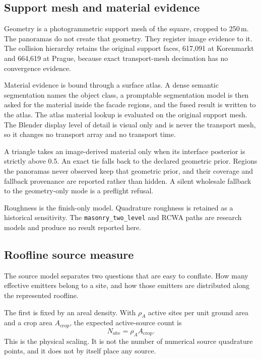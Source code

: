 \subsection{Support mesh and material evidence}
\label{sec:atlas}

Geometry is a photogrammetric support mesh of the square, cropped to 250\,m.
The panoramas do not create that geometry. They register image evidence to it.
The collision hierarchy retains the original support faces, 617,091 at
Korenmarkt and 664,619 at Prague, because exact transport-mesh decimation has
no convergence evidence.

Material evidence is bound through a surface atlas. A dense semantic
segmentation names the object class, a promptable segmentation model is then
asked for the material inside the facade regions, and the fused result is
written to the atlas. The atlas material lookup is evaluated on the original
support mesh. The Blender display level of detail is visual only and is never
the transport mesh, so it changes no transport array and no transport time.

A triangle takes an image-derived material only when its interface posterior is
strictly above 0.5. An exact tie falls back to the declared geometric prior.
Regions the panoramas never observed keep that geometric prior, and their
coverage and fallback provenance are reported rather than hidden. A silent
wholesale fallback to the geometry-only mode is a preflight refusal.

Roughness is the finish-only model. Quadrature roughness is retained as a
historical sensitivity. The \texttt{masonry\_two\_level} and RCWA paths are
research models and produce no result reported here.

\subsection{Roofline source measure}
\label{sec:source-measure}

The source model separates two questions that are easy to conflate. How many
effective emitters belong to a site, and how those emitters are distributed
along the represented roofline.

The first is fixed by an areal density. With $\rho_A$ active sites per unit
ground area and a crop area $A_{\mathrm{crop}}$, the expected active-source
count is
\begin{equation}
  N_{\mathrm{site}} = \rho_A A_{\mathrm{crop}} .
  \label{eq:nsite}
\end{equation}
This is the physical scaling. It is not the number of numerical source
quadrature points, and it does not by itself place any source.

